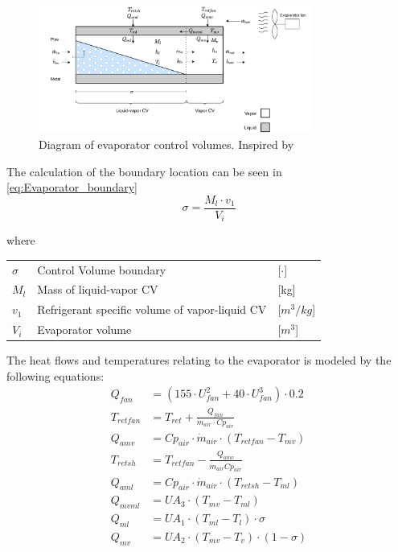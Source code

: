 \begin{figure}[h!]
	\centering
	\includegraphics[width=0.8\textwidth]{Graphics/Evaporator_CV_diagram.drawio.pdf}
	\caption{Diagram of evaporator control volumes. Inspired by  \cite{Sorensen2013} \cite{Borlum2016}}
	\label{fig:evapo_CV}
\end{figure}






The calculation of the boundary location can be seen in \cref{eq:Evaporator_boundary}
\begin{equation} \label{eq:Evaporator_boundary}
	\sigma = \frac{M_l \cdot v_1}{V_i} 
\end{equation}

where

\begin{center}
	\begin{tabular}{l p{8cm} l}
		$\sigma$				& Control Volume boundary 			& [$\cdot$] \\		
		$M_l$				& Mass of liquid-vapor CV 			& [\si{kg}] \\		
		$v_1$				& Refrigerant specific volume of vapor-liquid CV	& [$\si{m}^3/\si{kg}$] \\		
		$V_i$				& Evaporator volume 			& [$\si{m}^3$]
	\end{tabular}
\end{center}


The heat flows and temperatures relating to the evaporator is modeled by the following equations:
\begin{align}
	Q_{fan} 		& = (155 \cdot U_{fan}^2 + 40 \cdot U_{fan}^3) \cdot 0.2 \\
	T_{retfan} 		& = T_{ret} + \frac{Q_{fan}}{\dot{m}_{air} \cdot Cp_{air}} \\
	Q_{amv} 		& = Cp_{air} \cdot \dot{m}_{air} \cdot (T_{retfan} - T_{mv}) \\
	T_{retsh} 		& = T_{retfan} - \frac{Q_{amv}}{\dot{m}_{air} \dot Cp_{air}} \\
	Q_{aml} 		& = Cp_{air} \cdot \dot{m}_{air} \cdot (T_{retsh} - T_{ml}) \\
	Q_{mvml} 		& = U A_3 \cdot (T_{mv} - T_{ml}) \\
	Q_{ml} 			& = U A_1 \cdot (T_{ml} - T_l) \cdot \sigma\\
	Q_{mv} 			& = U A_2 \cdot (T_{mv} - T_v) \cdot (1- \sigma)
\end{align}

